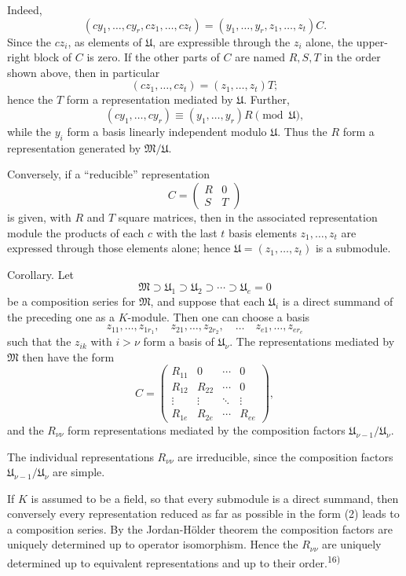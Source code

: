 \documentclass[11pt]{article}
\providecommand{\mM}{\mathfrak{M}}
\providecommand{\mU}{\mathfrak{U}}
\begin{document}
Indeed,
\[
        (cy_1,\ldots,cy_r,cz_1,\ldots,cz_t)
        =(y_1,\ldots,y_r,z_1,\ldots,z_t)C.
\]
Since the $cz_i$, as elements of $\mU$, are expressible through the $z_i$ alone, the upper-right block of $C$ is zero. If the other parts of $C$ are named $R,S,T$ in the order shown above, then in particular
\[
        (cz_1,\ldots,cz_t)=(z_1,\ldots,z_t)T;
\]
hence the $T$ form a representation mediated by $\mU$. Further,
\[
        (cy_1,\ldots,cy_r)\equiv (y_1,\ldots,y_r)R \pmod{\mU},
\]
while the $y_i$ form a basis linearly independent modulo $\mU$. Thus the $R$ form a representation generated by $\mM/\mU$.

Conversely, if a ``reducible'' representation
\[
        C=\begin{pmatrix}R&0\\ S&T\end{pmatrix}
\]
is given, with $R$ and $T$ square matrices, then in the associated representation module the products of each $c$ with the last $t$ basis elements $z_1,\ldots,z_t$ are expressed through those elements alone; hence $\mU=(z_1,\ldots,z_t)$ is a submodule.

Corollary. Let
\[
        \mM\supset \mU_1\supset \mU_2\supset\cdots\supset \mU_e=0
\]
be a composition series for $\mM$, and suppose that each $\mU_i$ is a direct summand of the preceding one as a $K$-module. Then one can choose a basis
\[
        z_{11},\ldots,z_{1r_1},\quad
        z_{21},\ldots,z_{2r_2},\quad\ldots\quad
        z_{e1},\ldots,z_{er_e}
\]
such that the $z_{ik}$ with $i>\nu$ form a basis of $\mU_\nu$. The representations mediated by $\mM$ then have the form
\[
 C=\begin{pmatrix}
 R_{11}&0&\cdots&0\\
 R_{12}&R_{22}&\cdots&0\\
 \vdots&\vdots&\ddots&\vdots\\
 R_{1e}&R_{2e}&\cdots&R_{ee}
 \end{pmatrix},                                      \tag{2}
\]
and the $R_{\nu\nu}$ form representations mediated by the composition factors $\mU_{\nu-1}/\mU_\nu$.

The individual representations $R_{\nu\nu}$ are irreducible, since the composition factors $\mU_{\nu-1}/\mU_\nu$ are simple.

If $K$ is assumed to be a field, so that every submodule is a direct summand, then conversely every representation reduced as far as possible in the form (2) leads to a composition series. By the Jordan-Hölder theorem the composition factors are uniquely determined up to operator isomorphism. Hence the $R_{\nu\nu}$ are uniquely determined up to equivalent representations and up to their order.\textsuperscript{16)}
\end{document}
